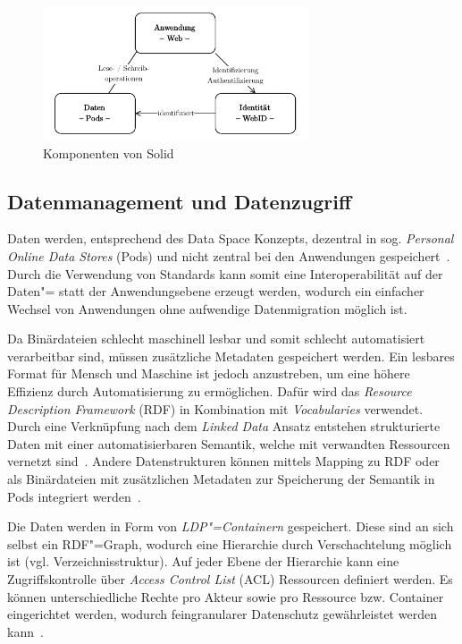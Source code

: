 \begin{figure}[b]
    \includegraphics[width=0.7\textwidth]{./assets/solid_triangle.drawio.pdf}
    \caption{Komponenten von Solid}
    \label{fig:solid-components}
\end{figure}


\subsection{Datenmanagement und Datenzugriff}

Daten werden, entsprechend des Data Space Konzepts, dezentral in sog. \emph{Personal Online Data Stores} (Pods) und nicht zentral bei den Anwendungen gespeichert~\cite{mecklerWebLinkedData2023}.
Durch die Verwendung von Standards kann somit eine Interoperabilität auf der Daten"= statt der Anwendungsebene erzeugt werden, wodurch ein einfacher Wechsel von Anwendungen ohne aufwendige Datenmigration möglich ist.

Da Binärdateien schlecht maschinell lesbar und somit schlecht automatisiert verarbeitbar sind, müssen zusätzliche Metadaten gespeichert werden.
Ein lesbares Format für Mensch und Maschine ist jedoch anzustreben, um eine höhere Effizienz durch Automatisierung zu ermöglichen.
Dafür wird das \emph{Resource Description Framework} (RDF) in Kombination mit \emph{Vocabularies} verwendet.
Durch eine Verknüpfung nach dem \emph{Linked Data} Ansatz entstehen strukturierte Daten mit einer automatisierbaren Semantik, welche mit verwandten Ressourcen vernetzt sind~\cite{bizerLinkedDataStory2009,mecklerWebLinkedData2023,sambraSolidPlatformDecentralized2016}.
Andere Datenstrukturen können mittels Mapping zu RDF oder als Binärdateien mit zusätzlichen Metadaten zur Speicherung der Semantik in Pods integriert werden~\cite{mecklerWebLinkedData2023,sambraSolidPlatformDecentralized2016}.

Die Daten werden in Form von \emph{LDP"=Containern} gespeichert.
Diese sind an sich selbst ein RDF"=Graph, wodurch eine Hierarchie durch Verschachtelung möglich ist (vgl. Verzeichnisstruktur).
Auf jeder Ebene der Hierarchie kann eine Zugriffskontrolle über \emph{Access Control List} (ACL) Ressourcen definiert werden.
Es können unterschiedliche Rechte pro Akteur sowie pro Ressource bzw. Container eingerichtet werden, wodurch feingranularer Datenschutz gewährleistet werden kann~\cite{mecklerWebLinkedData2023,sambraSolidPlatformDecentralized2016}.

